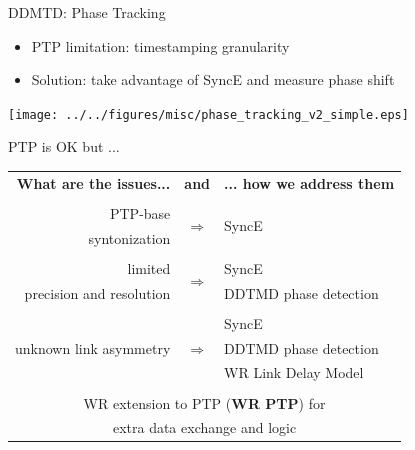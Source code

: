 \documentclass[compress,red]{beamer}
\begin{document}
\begin{frame}{DDMTD: Phase Tracking}
	\begin{center}
    \begin{itemize}
      \item PTP limitation: timestamping granularity
      \item Solution: take advantage of SyncE and measure phase shift
    \end{itemize}
		\texttt{[image: ../../figures/misc/phase\_tracking\_v2\_simple.eps]}
	\end{center}

\end{frame}
\begin{frame}{PTP is OK but ...}

  \resizebox{11cm}{!} 
  {
    \begin{tabular}{ r c l }
  {\bf What are the issues...} 	& {\bf and}      & {\bf ... how we address them}  \\
				&     		 &        \\
      PTP-base		 	& \multirow{2}{*}{$\Rightarrow$}  & \multirow{2}{*}{SyncE }\\
      syntonization	        &      		 &        \\
				&      		 &        			\\
      limited             	&\multirow{2}{*}{$\Rightarrow$}  	 & SyncE \\
      precision and resolution  &      		 & DDTMD phase detection\\
				&    		 &        \\
			        &      		 & SyncE  \\
      unknown link asymmetry    & $\Rightarrow$  & DDTMD phase detection \\
				&      		 & WR Link Delay Model \\
				&      		 &        \\
      \multicolumn{3}{c}{WR extension to PTP ({\bf WR PTP}) for } \\
      \multicolumn{3}{c}{extra data exchange and logic} \\
    \end{tabular}
  }
\end{frame}
\end{document}
